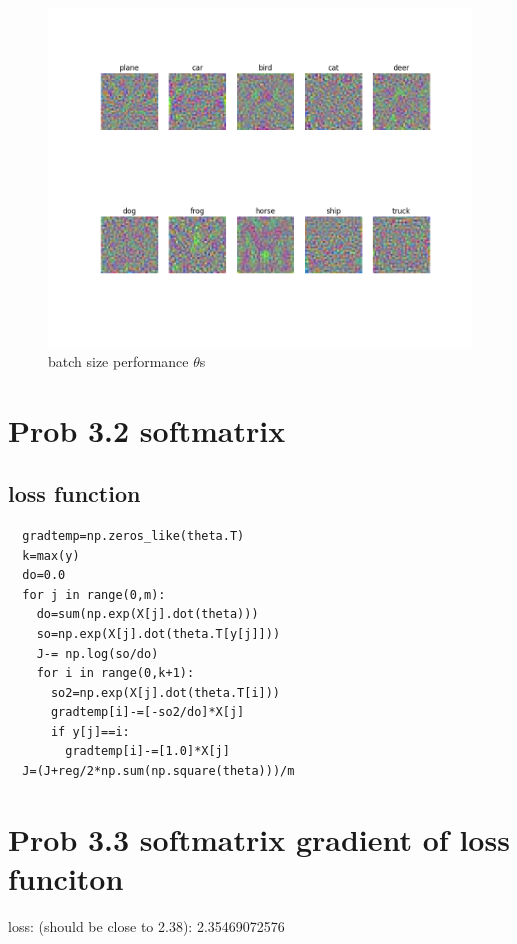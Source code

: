 \documentclass[pdftex,11pt]{article}
\begin{document}
\begin{figure}[H]
  \caption{batch size performance $\theta$s}
  \centering
    \includegraphics[scale=0.5]{classifer.png}
\end{figure}





\section{Prob 3.2 softmatrix} 
\subsection{loss function}

\begin{lstlisting}  
  gradtemp=np.zeros_like(theta.T)
  k=max(y)
  do=0.0
  for j in range(0,m):
    do=sum(np.exp(X[j].dot(theta)))
    so=np.exp(X[j].dot(theta.T[y[j]]))
    J-= np.log(so/do)
    for i in range(0,k+1):
      so2=np.exp(X[j].dot(theta.T[i]))
      gradtemp[i]-=[-so2/do]*X[j]
      if y[j]==i:
        gradtemp[i]-=[1.0]*X[j]
  J=(J+reg/2*np.sum(np.square(theta)))/m
\end{lstlisting}  

\section{Prob 3.3 softmatrix gradient of loss funciton} 


loss: (should be close to 2.38):  2.35469072576
\end{document}
